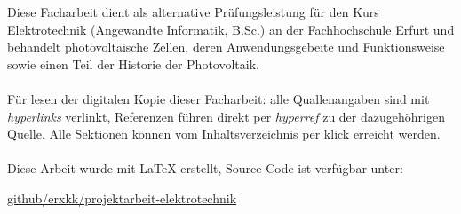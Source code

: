 Diese Facharbeit dient als alternative Prüfungsleistung für den
Kurs Elektrotechnik (Angewandte Informatik, B.Sc.) an der
Fachhochschule Erfurt und behandelt photovoltaische Zellen, deren
Anwendungsgebeite und Funktionsweise sowie einen Teil der
Historie der Photovoltaik.
\\\\
Für lesen der digitalen Kopie dieser Facharbeit: alle
Quallenangaben sind mit \textit{hyperlinks} verlinkt, Referenzen
führen direkt per \textit{hyperref} zu der dazugehöhrigen Quelle.
Alle Sektionen können vom Inhaltsverzeichnis per klick erreicht
werden.
\\\\
Diese Arbeit wurde mit \LaTeX{} erstellt, Source Code ist verfügbar unter:
\begin{center}
    \hyperlink{https://github.com/erxkk/projektarbeit-elektrotechnik}
    {github/erxkk/projektarbeit-elektrotechnik}
\end{center}